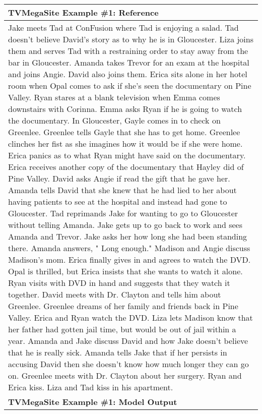 \documentclass{article} \usepackage{iclr2022_conference,times}
\begin{document}
\begin{table}[!htbp]
    \centering
    \tiny
    \begin{tabular}{p{\linewidth}} 
    \toprule
    \textbf{TVMegaSite Example \#1: Reference} \\
    \midrule
Jake meets Tad at ConFusion where Tad is enjoying a salad. Tad doesn't believe David's story as to why he is in Gloucester. Liza joins them and serves Tad with a restraining order to stay away from the bar in Gloucester. Amanda takes Trevor for an exam at the hospital and joins Angie. David also joins them. Erica sits alone in her hotel room when Opal comes to ask if she's seen the documentary on Pine Valley. Ryan stares at a blank television when Emma comes downstairs with Corinna. Emma asks Ryan if he is going to watch the documentary. In Gloucester, Gayle comes in to check on Greenlee. Greenlee tells Gayle that she has to get home. Greenlee clinches her fist as she imagines how it would be if she were home. Erica panics as to what Ryan might have said on the documentary. Erica receives another copy of the documentary that Hayley did of Pine Valley. David asks Angie if read the gift that he gave her. Amanda tells David that she knew that he had lied to her about having patients to see at the hospital and instead had gone to Gloucester. Tad reprimands Jake for wanting to go to Gloucester without telling Amanda. Jake gets up to go back to work and sees Amanda and Trevor. Jake asks her how long she had been standing there. Amanda answers, " Long enough." Madison and Angie discuss Madison's mom. Erica finally gives in and agrees to watch the DVD. Opal is thrilled, but Erica insists that she wants to watch it alone. Ryan visits with DVD in hand and suggests that they watch it together. David meets with Dr. Clayton and tells him about Greenlee. Greenlee dreams of her family and friends back in Pine Valley. Erica and Ryan watch the DVD. Liza lets Madison know that her father had gotten jail time, but would be out of jail within a year. Amanda and Jake discuss David and how Jake doesn't believe that he is really sick. Amanda tells Jake that if her persists in accusing David then she doesn't know how much longer they can go on. Greenlee meets with Dr. Clayton about her surgery. Ryan and Erica kiss. Liza and Tad kiss in his apartment.
    \\
    \midrule
    \textbf{TVMegaSite Example \#1: Model Output} \\
    \midrule

\end{tabular}
\end{table}
\end{document}
